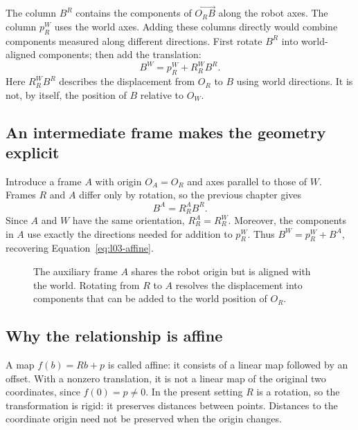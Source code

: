 The column $B^R$ contains the components of $\overrightarrow{O_RB}$ along
the robot axes. The column $p_R^W$ uses the world axes. Adding these columns
directly would combine components measured along different directions.
First rotate $B^R$ into world-aligned components; then add the translation:
\begin{equation}
 \boxed{B^W=p_R^W+R_R^W B^R.}
 \label{eq:l03-affine}
\end{equation}
Here $R_R^W B^R$ describes the displacement from $O_R$ to $B$ using world
directions. It is not, by itself, the position of $B$ relative to $O_W$.

\subsection{An intermediate frame makes the geometry explicit}
Introduce a frame $A$ with origin $O_A=O_R$ and axes parallel to those of $W$.
Frames $R$ and $A$ differ only by rotation, so the previous chapter gives
\[
 B^A=R_R^A B^R.
\]
Since $A$ and $W$ have the same orientation, $R_R^A=R_R^W$. Moreover, the
components in $A$ use exactly the directions needed for addition to $p_R^W$.
Thus $B^W=p_R^W+B^A$, recovering Equation~\eqref{eq:l03-affine}.

\begin{figure}[htbp]
\centering
\caption{The auxiliary frame $A$ shares the robot origin but is aligned with
the world. Rotating from $R$ to $A$ resolves the displacement into components
that can be added to the world position of $O_R$.}
\label{fig:l03-intermediate}
\end{figure}

\subsection{Why the relationship is affine}
A map $f(b)=Rb+p$ is called affine: it consists of a linear map followed by
an offset. With a nonzero translation, it is not a linear map of the original
two coordinates, since $f(0)=p\ne0$. In the present setting $R$ is a rotation,
so the transformation is rigid: it preserves distances between points.
Distances to the coordinate origin need not be preserved when the origin changes.

